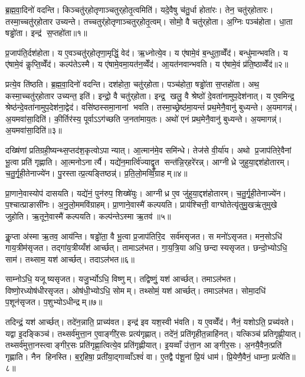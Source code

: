 \clearpage
{}
\setcounter{anuvakam}{0}
ब्र॒ह्म॒वा॒दिनो॑ वदन्ति। किञ्चतु॑र्‌होतृणाञ्चतुर्‌होतृ॒त्वमिति॑। यदे॒वैषु च॑तु॒र्धा होता॑रः। तेन॒ चतु॑र्‌होतारः। तस्मा॒च्चतु॑र्‌होतार उच्यन्ते। तच्चतुर्॑होतृणाञ्चतुर्‌होतृ॒त्वम्। सोमो॒ वै चतु॑र्‌होता। अ॒ग्निः पञ्च॑होता। धा॒ता षड्ढो॑ता। इन्द्र॑ स॒प्तहो॑ता॥१॥

प्र॒जाप॑ति॒र्दश॑होता। य ए॒वञ्चतु॑र्‌होतृणा॒मृद्धिं॒ वेद॑। ऋ॒ध्नोत्ये॒व। य ए॑षामे॒वं ब॒न्धुता॒व्वेँद॑। बन्धु॑मान्भवति। य ए॑षामे॒वं कॢप्ति॒व्वेँद॑। कल्प॑तेऽस्मै। य ए॑षामे॒वमा॒यत॑न॒व्वेँद॑। आ॒यत॑नवान्भवति। य ए॑षामे॒वं प्र॑ति॒ष्ठाव्वेँद॑॥२॥

प्रत्ये॒व ति॑ष्ठति। ब्र॒ह्म॒वा॒दिनो॑ वदन्ति। दश॑होता॒ चतु॑र्‌होता। पञ्च॑होता॒ षड्ढो॑ता स॒प्तहो॑ता। अथ॒ कस्मा॒च्चतु॑र्‌होतार उच्यन्त॒ इति॑। इन्द्रो॒ वै चतु॑र्‌होता। इन्द्र॒ खलु॒ वै श्रेष्ठो॑ दे॒वता॑नामुप॒देश॑नात्। य ए॒वमिन्द्र॒ श्रेष्ठ॑न्दे॒वता॑नामुप॒देश॑ना॒द्वेद॑। वसि॑ष्ठस्समा॒नानां भवति। तस्मा॒च्छ्रेष्ठ॑मा॒यन्तं॑ प्रथ॒मेनै॒वानु॑ बुध्यन्ते। अ॒यमागन्न्॑। अ॒यमवा॑सा॒दिति॑। की॒र्तिर॑स्य॒ पूर्वाऽऽग॑च्छति ज॒नता॑माय॒तः। अथो॑ एनं प्रथ॒मेनै॒वानु॑ बुध्यन्ते। अ॒यमागन्न्॑। अ॒यमवा॑सा॒दिति॑॥३॥\anuvakamend[स॒प्तहो॑ता प्रति॒ष्ठाव्वेँद॑ बुध्यन्ते॒ षट्च॑]

दख्षि॑णां प्रतिग्रही॒ष्यन्थ्स॒प्तद॑श॒कृत्वोऽपान्यात्। आ॒त्मान॑मे॒व समि॑न्धे। तेज॑से वी॒र्या॑य। अथो प्र॒जाप॑तिरे॒वैनां भू॒त्वा प्रति॑ गृह्णाति। आ॒त्मनोऽनार्त्यै। यद्ये॑न॒मार्त्वि॑ज्याद्वृ॒त सन्त॑न्नि॒र्‌हरे॑रन्न्। आग्नीध्रे जुहुया॒द्दश॑होतारम्। च॒तु॒र्गृ॒ही॒तेनाज्ये॑न। पु॒रस्तात्प्र॒त्यङ्तिष्ठन्न्॑। प्र॒ति॒लो॒मव्विँ॒ग्राहम्॥४॥

प्रा॒णाने॒वास्योप॑ दासयति। यद्ये॑नं॒ पुन॑रुप॒ शिख्षे॑युः। आग्नीध्र ए॒व जु॑हुया॒द्दश॑होतारम्। च॒तु॒र्गृ॒ही॒तेनाज्ये॑न। प॒श्चात्प्राङासी॑नः। अ॒नु॒लो॒ममवि॑ग्राहम्। प्रा॒णाने॒वास्मै॑ कल्पयति। प्राय॑श्चित्ती॒ वाग्घोतेत्यृ॑तुमु॒खऋ॑तुमुखे जुहोति। ऋ॒तूने॒वास्मै॑ कल्पयति। कल्प॑न्तेऽस्मा ऋ॒तव॑॥५॥

कॢ॒प्ता अ॑स्मा ऋ॒तव॒ आय॑न्ति। षड्ढो॑ता॒ वै भू॒त्वा प्र॒जाप॑तिरि॒द सर्व॑मसृजत। स मनो॑ऽसृजत। मन॒सोऽधि॑ गाय॒त्रीम॑सृजत। तद्गा॑य॒त्रीय्यँश॑ आर्च्छत्। तामाऽल॑भत। गा॒य॒त्रि॒या अधि॒ छन्दास्यसृजत। छन्दो॒भ्योऽधि॒ साम॑। तथ्साम॒ यश॑ आर्च्छत्। तदाऽल॑भत॥६॥

साम्नोऽधि॒ यजूष्यसृजत। यजु॒र्भ्योऽधि॒ विष्णुम्। तद्विष्णुं॒ यश॑ आर्च्छत्। तमाऽल॑भत। विष्णो॒रध्योष॑धीरसृजत। ओष॑धी॒भ्योऽधि॒ सोमम्। तथ्सोमं॒ यश॑ आर्च्छत्। तमाऽल॑भत। सोमा॒दधि॑ प॒शून॑सृजत। प॒शुभ्योऽधीन्द्रम्॥७॥

तदिन्द्रं॒ यश॑ आर्च्छत्। तदे॑न॒न्नाति॒ प्राच्य॑वत। इन्द्र॑ इव यश॒स्वी भ॑वति। य ए॒वव्वेँद॑। नैनं॒ यशोऽति॒ प्रच्य॑वते। यद्वा इ॒दङ्किञ्च॑। तथ्सर्व॑मुत्ता॒न ए॒वाङ्गी॑र॒सः प्रत्य॑गृह्णात्। तदे॑नं॒ प्रति॑गृहीत॒न्नाहि॑नत्। यत्किञ्च॑ प्रतिगृह्णी॒यात्। तथ्सर्व॑मुत्ता॒नस्त्वाङ्गीर॒सः प्रति॑गृह्णा॒त्वित्ये॒व प्रति॑गृह्णीयात्। इ॒यव्वाँ उ॑त्ता॒न आङ्गीर॒सः। अ॒नयै॒वैन॒त्प्रति॑ गृह्णाति। नैन हिनस्ति। ब॒र्॒हिषा॒ प्रती॑या॒द्गाव्वाँऽश्वं॑ वा। ए॒तद्वै प॑शू॒नां प्रि॒यं धाम॑। प्रि॒येणै॒वैनं॒ धाम्ना॒ प्रत्ये॑ति॥८॥\anuvakamend[वि॒ग्राह॑मृ॒तव॒स्तदाऽल॑भ॒तेन्द्र॑ङ्गृह्णीया॒थ्षट्च॑]

